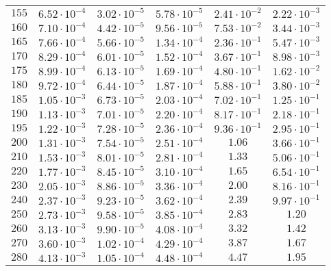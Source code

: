 \begin{table}
\begin{tabular}{lccccc}
$155 $&$ 6.52\cdot 10^{-4} $&$ 3.02\cdot 10^{-5} $&$ 5.78\cdot 10^{-5} $&$ 2.41\cdot 10^{-2} $&$ 2.22\cdot 10^{-3}   $\\
$160 $&$ 7.10\cdot 10^{-4} $&$ 4.42\cdot 10^{-5} $&$ 9.56\cdot 10^{-5} $&$ 7.53\cdot 10^{-2} $&$ 3.44\cdot 10^{-3}   $\\
$165 $&$ 7.66\cdot 10^{-4} $&$ 5.66\cdot 10^{-5} $&$ 1.34\cdot 10^{-4} $&$ 2.36\cdot 10^{-1} $&$ 5.47\cdot 10^{-3}   $\\
$170 $&$ 8.29\cdot 10^{-4} $&$ 6.01\cdot 10^{-5} $&$ 1.52\cdot 10^{-4} $&$ 3.67\cdot 10^{-1} $&$ 8.98\cdot 10^{-3}   $\\
$175 $&$ 8.99\cdot 10^{-4} $&$ 6.13\cdot 10^{-5} $&$ 1.69\cdot 10^{-4} $&$ 4.80\cdot 10^{-1} $&$ 1.62\cdot 10^{-2}   $\\
$180 $&$ 9.72\cdot 10^{-4} $&$ 6.44\cdot 10^{-5} $&$ 1.87\cdot 10^{-4} $&$ 5.88\cdot 10^{-1} $&$ 3.80\cdot 10^{-2}   $\\
$185 $&$ 1.05\cdot 10^{-3} $&$ 6.73\cdot 10^{-5} $&$ 2.03\cdot 10^{-4} $&$ 7.02\cdot 10^{-1} $&$ 1.25\cdot 10^{-1}   $\\
$190 $&$ 1.13\cdot 10^{-3} $&$ 7.01\cdot 10^{-5} $&$ 2.20\cdot 10^{-4} $&$ 8.17\cdot 10^{-1} $&$ 2.18\cdot 10^{-1}   $\\
$195 $&$ 1.22\cdot 10^{-3} $&$ 7.28\cdot 10^{-5} $&$ 2.36\cdot 10^{-4} $&$ 9.36\cdot 10^{-1} $&$ 2.95\cdot 10^{-1}   $\\
$200 $&$ 1.31\cdot 10^{-3} $&$ 7.54\cdot 10^{-5} $&$ 2.51\cdot 10^{-4} $&$ 1.06 $&$ 3.66\cdot 10^{-1}   $\\
$210 $&$ 1.53\cdot 10^{-3} $&$ 8.01\cdot 10^{-5} $&$ 2.81\cdot 10^{-4} $&$ 1.33 $&$ 5.06\cdot 10^{-1}   $\\
$220 $&$ 1.77\cdot 10^{-3} $&$ 8.45\cdot 10^{-5} $&$ 3.10\cdot 10^{-4} $&$ 1.65 $&$ 6.54\cdot 10^{-1}   $\\
$230 $&$ 2.05\cdot 10^{-3} $&$ 8.86\cdot 10^{-5} $&$ 3.36\cdot 10^{-4} $&$ 2.00 $&$ 8.16\cdot 10^{-1}   $\\
$240 $&$ 2.37\cdot 10^{-3} $&$ 9.23\cdot 10^{-5} $&$ 3.62\cdot 10^{-4} $&$ 2.39 $&$ 9.97\cdot 10^{-1}   $\\
$250 $&$ 2.73\cdot 10^{-3} $&$ 9.58\cdot 10^{-5} $&$ 3.85\cdot 10^{-4} $&$ 2.83 $&$ 1.20  $\\
$260 $&$ 3.13\cdot 10^{-3} $&$ 9.90\cdot 10^{-5} $&$ 4.08\cdot 10^{-4} $&$ 3.32 $&$ 1.42  $\\
$270 $&$ 3.60\cdot 10^{-3} $&$ 1.02\cdot 10^{-4} $&$ 4.29\cdot 10^{-4} $&$ 3.87 $&$ 1.67  $\\
$280 $&$ 4.13\cdot 10^{-3} $&$ 1.05\cdot 10^{-4} $&$ 4.48\cdot 10^{-4} $&$ 4.47 $&$ 1.95  $\\

\end{tabular}
\end{table}
